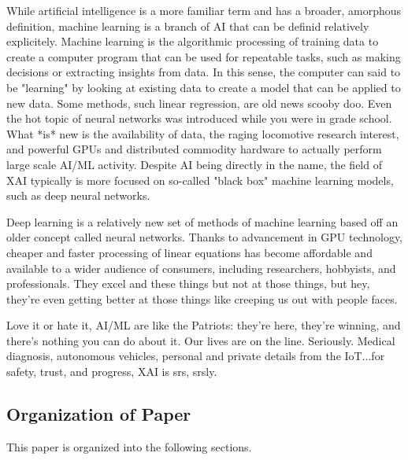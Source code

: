\documentclass{IEEEtran}
\begin{document}
While artificial intelligence is a more familiar term and has a broader, amorphous definition, machine learning is a branch of AI that can be definid relatively explicitely.  Machine learning is the algorithmic processing of training data to create a computer program that can be used for repeatable tasks, such as making decisions or extracting insights from data.  In this sense, the computer can said to be "learning" by looking at existing data to create a model that can be applied to new data.  Some methods, such linear regression, are old news scooby doo.  Even the hot topic of neural networks was introduced while you were in grade school.  What *is* new is the availability of data, the raging locomotive research interest, and powerful GPUs and distributed commodity hardware to actually perform large scale AI/ML activity.  Despite AI being directly in the name, the field of XAI typically is more focused on so-called "black box" machine learning models, such as deep neural networks.  


Deep learning is a relatively new set of methods of machine learning based off an older concept called neural networks.  Thanks to advancement in GPU technology, cheaper and faster processing of linear equations has become affordable and available to a wider audience of consumers, including researchers, hobbyists, and professionals.  They excel and these things but not at those things, but hey, they're even getting better at those things like creeping us out with people faces.

Love it or hate it, AI/ML are like the Patriots:  they're here, they're winning, and there's nothing you can do about it.  Our lives are on the line.  Seriously.  Medical diagnosis, autonomous vehicles, personal and private details from the IoT...for safety, trust, and progress, XAI is srs, srsly.  


\subsection{Organization of Paper}

This paper is organized into the following sections.
\end{document}
